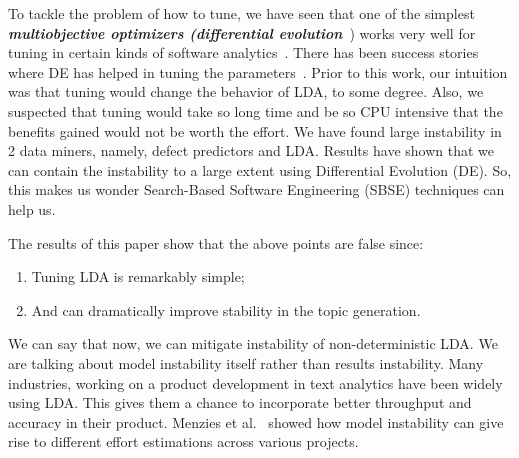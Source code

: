 \documentclass[conference]{IEEEtran}
\theoremstyle{break}
\begin{document}
To tackle the problem of how to tune, we have seen that one of the simplest \textit{\textbf{multiobjective optimizers (differential evolution}}~\cite{storn1997differential}) works very well for tuning in certain kinds of software analytics~\cite{fu2016tuning}. There has been success stories where DE has helped in tuning the parameters~\cite{fu2016tuning, bazi2014differential, chiha2012tuning}. Prior to this work, our intuition was that tuning would change the behavior of LDA, to some degree. Also, we suspected that tuning would take so long time and be so CPU intensive that the benefits gained would not be worth the effort. We have found large instability in 2 data miners, namely, defect predictors and LDA. Results have shown that we can contain the instability to a large extent using Differential Evolution (DE). So, this makes us wonder Search-Based Software Engineering (SBSE) techniques can help us.

The results of this paper show that the above points are false since:
\begin{enumerate}
  \item Tuning LDA is remarkably simple;
  \item And can dramatically improve stability in the topic generation.
\end{enumerate}

We can say that now, we can mitigate instability of non-deterministic LDA. We are talking about model instability itself rather than results instability. Many industries, working on a product development in text analytics have been widely using LDA. This gives them a chance to incorporate better throughput and accuracy in their product. Menzies et al.~\cite{menzieslocal} showed how model instability can give rise to different effort estimations across various projects.
\end{document}
